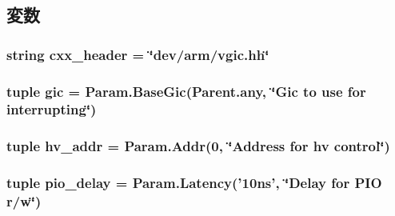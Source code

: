 \subsection{変数}
\hypertarget{classRealView_1_1VGic_a17da7064bc5c518791f0c891eff05fda}{
\subsubsection[{cxx\_\-header}]{\setlength{\rightskip}{0pt plus 5cm}string {\bf cxx\_\-header} = \char`\"{}dev/arm/vgic.hh\char`\"{}}}
\label{classRealView_1_1VGic_a17da7064bc5c518791f0c891eff05fda}
\hypertarget{classRealView_1_1VGic_a40243beb62d217c3a9e35801ae739fd0}{
\subsubsection[{gic}]{\setlength{\rightskip}{0pt plus 5cm}tuple {\bf gic} = Param.BaseGic(Parent.any, \char`\"{}Gic to use for interrupting\char`\"{})}}
\label{classRealView_1_1VGic_a40243beb62d217c3a9e35801ae739fd0}
\hypertarget{classRealView_1_1VGic_abdd308d2d5926c04658247af1d328510}{
\subsubsection[{hv\_\-addr}]{\setlength{\rightskip}{0pt plus 5cm}tuple {\bf hv\_\-addr} = {\bf Param.Addr}(0, \char`\"{}Address for hv control\char`\"{})}}
\label{classRealView_1_1VGic_abdd308d2d5926c04658247af1d328510}
\hypertarget{classRealView_1_1VGic_a975673739b7ec6d13ec341b77941a070}{
\subsubsection[{pio\_\-delay}]{\setlength{\rightskip}{0pt plus 5cm}tuple {\bf pio\_\-delay} = Param.Latency('10ns', \char`\"{}Delay for PIO r/w\char`\"{})}}

